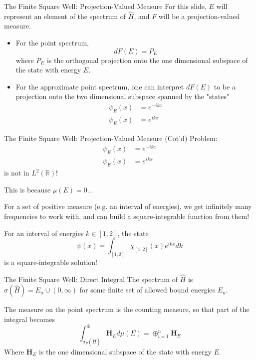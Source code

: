 \documentclass{beamer}
\begin{document}
\begin{frame}{The Finite Square Well: Projection-Valued Measure}
    For this slide, $E$ will represent an element of the spectrum of $\hat{H}$,
    and $F$ will be a projection-valued measure.

    \begin{itemize}
        \item For the point spectrum, 
    \[
        dF(E) = P_E
    \]
    where $P_E$ is the orthogonal
    projection onto the one dimensional subspace of the state with energy $E$.

\item For the approximate point spectrum, one can interpret $dF(E)$ to be a
    projection onto the two dimensional subspace spanned by the "states"
    \[
        \begin{aligned}
            \psi_{E}(x) &= e^{-ikx} \\
            \psi_{E}(x) &= e^{ikx}
        \end{aligned}
    \]
    \end{itemize}
\end{frame}

\begin{frame}{The Finite Square Well: Projection-Valued Measure (Cot'd)}
    Problem:
    \[
        \begin{aligned}
            \psi_{E}(x) &= e^{-ikx} \\
            \psi_{E}(x) &= e^{ikx}
        \end{aligned}
    \]
    is not in $L^2(\mathbb{R})$!

    \pause

    This is because $\mu(E) = 0$...

    \pause

    For a set of positive measure (e.g. an interval of energies), we get
    infinitely many frequencies to work with, and can build a square-integrable
    function from them!

    \begin{example}
        For an interval of energies $k\in[1,2]$, the state
        \[
            \psi(x) = \int_{[1,2]}\chi_{[1,2]}(x)e^{ikx}dk
            \]
        is a square-integrable solution!
    \end{example}
\end{frame}
\begin{frame}{The Finite Square Well: Direct Integral}
    The spectrum of $\hat{H}$ is $\sigma(\hat{H}) = {E_n}\cup(0,\infty)$ for
    some finite set of allowed bound energies $E_n$.

    The measure on the point spectrum is the counting measure, so that part of
    the integral becomes
    \[
        \int_{\sigma_P(\hat{H})}^{\oplus}\textbf{H}_{E}d\mu(E) =
        \oplus_{i=1}^{n} \textbf{H}_{E}
    \]
Where $\textbf{H}_E$ is the one dimensional subspace of the state with energy
    $E$.
\end{frame}
\end{document}
